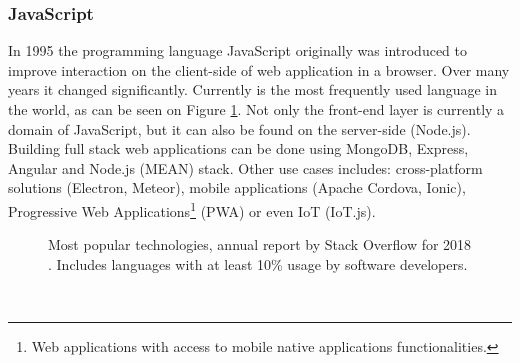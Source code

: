 \documentclass{article} %
\begin{document}
\subsubsection{JavaScript}
In 1995 the programming language JavaScript originally was introduced to improve interaction on the client-side of web application in a browser. Over many years it changed significantly. Currently is the most frequently used language in the world, as can be seen on Figure \ref{fig:stack_overflow_report}. Not only the front-end layer is currently a domain of JavaScript, but it can also be found on the server-side (Node.js). Building full stack web applications can be done using MongoDB, Express, Angular and Node.js (MEAN) stack. Other use cases includes: cross-platform solutions (Electron, Meteor), mobile applications (Apache Cordova, Ionic), Progressive Web Applications\footnote{Web applications with access to mobile native applications functionalities.} (PWA) or even IoT (IoT.js).
\begin{figure}[ht]
\centering
{}
\caption{Most popular technologies, annual report by Stack Overflow for 2018 \cite{bib:stack_overflow_report}. Includes languages with at least 10\% usage by software developers.}
\label{fig:stack_overflow_report}
\end{figure}\\
\end{document}
